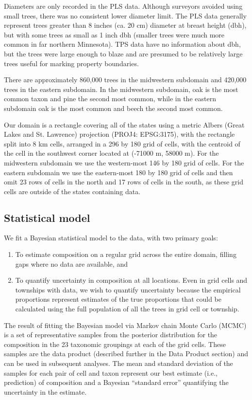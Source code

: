 \documentclass[10pt,letterpaper]{article}
\begin{document}
Diameters are only recorded in the PLS data. Although surveyors avoided
using small trees, there was no consistent lower diameter limit. The
PLS data generally represent trees greater than 8 inches (ca. 20
cm) diameter at breast height (dbh), but with some trees as small
as 1 inch dbh (smaller trees were much more common in far northern
Minnesota). TPS data have no information about dbh, but the trees
were large enough to blaze and are presumed to be relatively large
trees useful for marking property boundaries.

There are approximately 860,000 trees in the midwestern subdomain
and 420,000 trees in the eastern subdomain. In the midwestern subdomain,
oak is the most common taxon and pine the second most common, while
in the eastern subdomain oak is the most common and beech the second
most common.

Our domain is a rectangle covering all of the states using a metric
Albers (Great Lakes and St. Lawrence) projection (PROJ4: EPSG:3175),
with the rectangle split into 8 km cells, arranged in a 296 by 180
grid of cells, with the centroid of the cell in the southwest corner
located at (-71000 m, 58000 m). For the midwestern subdomain we use
the western-most 146 by 180 grid of cells. For the eastern subdomain
we use the eastern-most 180 by 180 grid of cells and then omit 23
rows of cells in the north and 17 rows of cells in the south, as these
grid cells are outside of the states containing data.


\subsection*{Statistical model\label{sec:Statistical-model}}

We fit a Bayesian statistical model to the data, with two primary
goals:
\begin{enumerate}
\item To estimate composition on a regular grid across the entire domain,
filling gaps where no data are available, and
\item To quantify uncertainty in composition at all locations. Even in grid
cells and townships with data, we wish to quantify uncertainty because
the empirical proportions represent estimates of the true proportions
that could be calculated using the full population of all the trees
in grid cell or township.
\end{enumerate}
The result of fitting the Bayesian model via Markov chain Monte Carlo
(MCMC) is a set of representative samples from the posterior distribution
for the composition in the 23 taxonomic groupings at each of the grid
cells. These samples are the data product (described further in the
Data Product section) and can be used in subsequent analyses. The
mean and standard deviation of the samples for each pair of cell and
taxon represent our best estimate (i.e., prediction) of composition
and a Bayesian ``standard error'' quantifying the uncertainty in
the estimate. 
\end{document}
